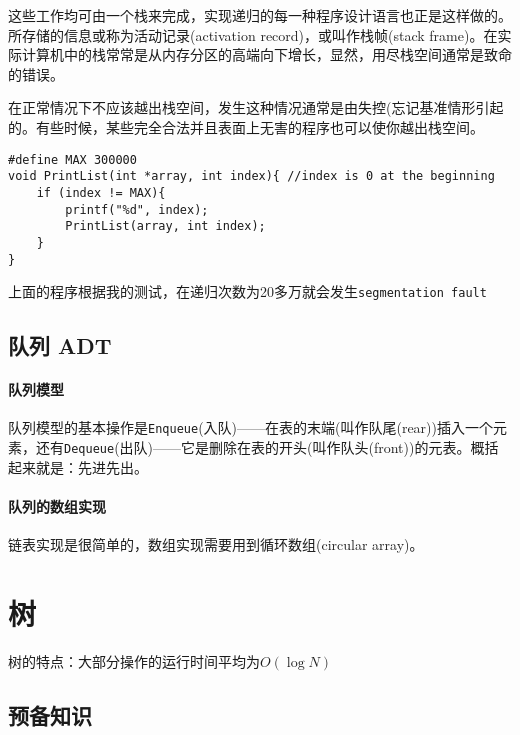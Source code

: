 \documentclass[utf8]{ctexbook}
\begin{document}
这些工作均可由一个栈来完成，实现递归的每一种程序设计语言也正是这样做的。所存储的信息或称为{\kaishu 活动记录}(activation record)，或叫作{\kaishu 栈帧}(stack frame)。在实际计算机中的栈常常是从内存分区的高端向下增长，显然，用尽栈空间通常是致命的错误。

在正常情况下不应该越出栈空间，发生这种情况通常是由失控({\heiti 忘记基准情形}引起的。有些时候，某些完全合法并且表面上无害的程序也可以使你越出栈空间。
\begin{lstlisting}
#define MAX 300000
void PrintList(int *array, int index){ //index is 0 at the beginning
    if (index != MAX){
        printf("%d", index);
        PrintList(array, int index);
    }
}
\end{lstlisting}
上面的程序根据我的测试，在递归次数为20多万就会发生\verb|segmentation fault|
\section{队列 ADT}
\subsubsection{队列模型}
队列模型的基本操作是\verb|Enqueue|(入队)——在表的末端(叫作队尾(rear))插入一个元素，还有\verb|Dequeue|(出队)——它是删除在表的开头(叫作队头(front))的元表。概括起来就是：{\kaishu 先进先出}。
\subsubsection{队列的数组实现}
链表实现是很简单的，数组实现需要用到{\kaishu 循环数组}(circular array)。

\chapter{树}
树的特点：大部分操作的运行时间平均为$O(\log N)$
\section{预备知识}
\end{document}
